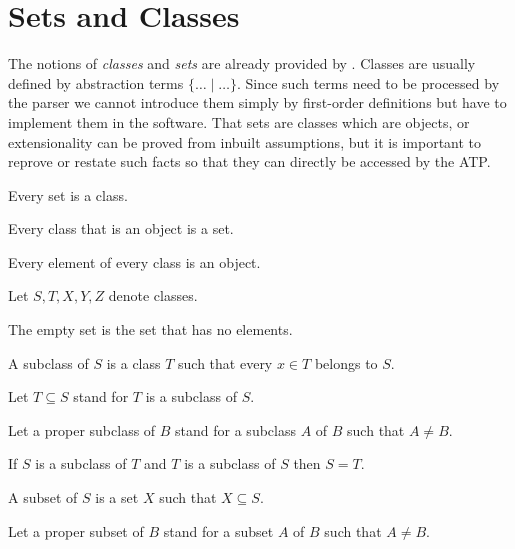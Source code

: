 \documentclass[11pt]{article}
\begin{document}
\section{Sets and Classes}
The notions of \textit{classes} and \textit{sets} are already
provided by \Naproche. Classes are usually defined by
abstraction terms $\{\dots\mid\dots\}$. Since such terms need to be
processed by the parser we cannot introduce them simply by first-order
definitions but have to implement them in the software.
That sets are classes which are objects, or extensionality can be proved
from inbuilt assumptions, but it is important to reprove or restate such
facts so that they can directly be accessed by the ATP.

\begin{forthel}

    
\begin{lemma} Every set is a class. \end{lemma}

\begin{lemma} Every class that is an object is a set. \end{lemma}

\begin{axiom} Every element of every class is an object.
\end{axiom}

Let $S,T,X,Y,Z$ denote classes.

\begin{definition} The empty set is the set that has
no elements.
\end{definition}

\begin{definition}
A subclass of $S$ is a class $T$ such that every $x \in T$
belongs to $S$.
\end{definition}

Let $T \subseteq S$ stand for $T$ is a subclass of $S$.

Let a proper subclass of $B$ stand for a subclass $A$ of $B$ such that $A\neq B$.

\begin{lemma}  If $S$ is a subclass of $T$ and
$T$ is a subclass of $S$ then $S = T$.
\end{lemma}

\begin{definition}
A subset of $S$ is a set $X$ such that $X \subseteq S$.
\end{definition}

Let a proper subset of $B$ stand for a subset $A$ of $B$ such that $A\neq B$.



\end{forthel}
\end{document}
